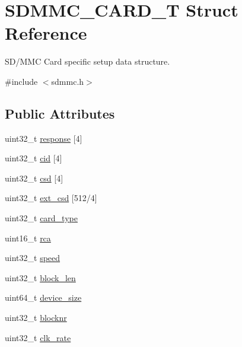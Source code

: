 \hypertarget{struct_s_d_m_m_c___c_a_r_d___t}{}\section{S\+D\+M\+M\+C\+\_\+\+C\+A\+R\+D\+\_\+T Struct Reference}
\label{struct_s_d_m_m_c___c_a_r_d___t}


S\+D/\+M\+MC Card specific setup data structure.  




{\ttfamily \#include $<$sdmmc.\+h$>$}

\subsection*{Public Attributes}
\begin{DoxyCompactItemize}
\item 
uint32\+\_\+t \hyperlink{struct_s_d_m_m_c___c_a_r_d___t_a35685aedeea24641fb1cb80a0a99314f}{response} \mbox{[}4\mbox{]}
\item 
uint32\+\_\+t \hyperlink{struct_s_d_m_m_c___c_a_r_d___t_a3e61ef8fe006f0d7f2e30910a565d9a0}{cid} \mbox{[}4\mbox{]}
\item 
uint32\+\_\+t \hyperlink{struct_s_d_m_m_c___c_a_r_d___t_afd44604509f49e67bdb3a5cf5db54eea}{csd} \mbox{[}4\mbox{]}
\item 
uint32\+\_\+t \hyperlink{struct_s_d_m_m_c___c_a_r_d___t_abce2d2420c62821bc583f3a89744ddf4}{ext\+\_\+csd} \mbox{[}512/4\mbox{]}
\item 
uint32\+\_\+t \hyperlink{struct_s_d_m_m_c___c_a_r_d___t_a0fdfec88d2df16adf835030f44cf47c0}{card\+\_\+type}
\item 
uint16\+\_\+t \hyperlink{struct_s_d_m_m_c___c_a_r_d___t_a3fbcc47f5e1dca1ed9b824dcb9f788ac}{rca}
\item 
uint32\+\_\+t \hyperlink{struct_s_d_m_m_c___c_a_r_d___t_a09a93494390a261b42e4b3d733ad3a05}{speed}
\item 
uint32\+\_\+t \hyperlink{struct_s_d_m_m_c___c_a_r_d___t_a5e6e7086556a130e250c3732878528bc}{block\+\_\+len}
\item 
uint64\+\_\+t \hyperlink{struct_s_d_m_m_c___c_a_r_d___t_a51ceefe761fde7515e078e14a112acd3}{device\+\_\+size}
\item 
uint32\+\_\+t \hyperlink{struct_s_d_m_m_c___c_a_r_d___t_af634111acb673198465718eec3ec1b67}{blocknr}
\item 
uint32\+\_\+t \hyperlink{struct_s_d_m_m_c___c_a_r_d___t_abedfed1bfea3d043b5e8fda33b4c7480}{clk\+\_\+rate}

\end{DoxyCompactItemize}
